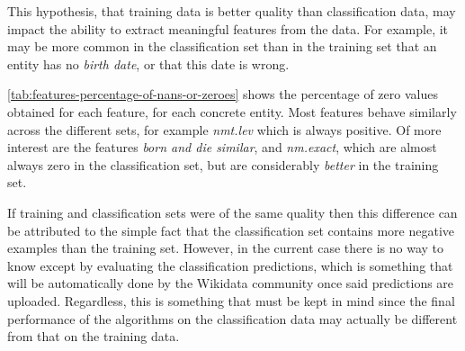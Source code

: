 \documentclass[epsfig,a4paper,11pt,titlepage,twoside,openany]{book}
\begin{document}
This hypothesis, that training data is better quality than classification data, may impact the ability to extract meaningful features from the data. For example, it may be more common in the classification set than in the training set that an entity has no \textit{birth date}, or that this date is wrong.

\autoref{tab:features-percentage-of-nans-or-zeroes} shows the percentage of zero values obtained for each feature, for each concrete entity. Most features behave similarly across the different sets, for example \textit{nmt.lev} which is always positive. Of more interest are the features \textit{born and die similar}, and \textit{nm.exact}, which are almost always zero in the classification set, but are considerably \textit{better} in the training set.

If training and classification sets were of the same quality then this difference can be attributed to the simple fact that the classification set contains more negative examples than the training set. However, in the current case there is no way to know except by evaluating the classification predictions, which is something that will be automatically done by the Wikidata community once said predictions are uploaded. Regardless, this is something that must be kept in mind since the final performance of the algorithms on the classification data may actually be different from that on the training data. 
\end{document}
